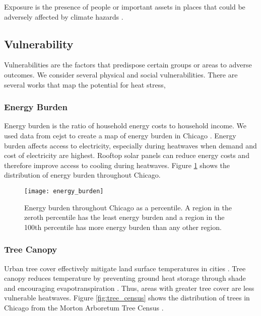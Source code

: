 Exposure is the presence of people or important assets in places that could be
adversely affected by climate hazards \cite{viner_understanding_2020}.

\subsection{Vulnerability}

Vulnerabilities are the factors that predispose certain groups or areas to adverse
outcomes. We consider several physical and social vulnerabilities. There are several
works that map the potential for heat stress, 

\subsubsection{Energy Burden}

Energy burden is the ratio of household energy costs to household income. We
used data from \ac{cejst} to create a map of energy burden in Chicago
\cite{council_on_environmental_quality_climate_nodate}. Energy
burden affects access to electricity, especially during heatwaves when demand
and cost of electricity are highest. Rooftop solar panels can reduce energy costs
and therefore improve access to cooling during heatwaves. Figure \ref{fig:eb} shows
the distribution of energy burden throughout Chicago.

\begin{figure}[H]
  \label{fig:eb}
    \begin{center}
      \texttt{[image: energy\_burden]}
      \vspace*{-2cm}
      \caption{Energy burden throughout Chicago as a percentile. A region in the zeroth
      percentile has the least energy burden and a region in the 100th percentile has
      more energy burden than any other region.}
    \end{center}
\end{figure}

\subsubsection{Tree Canopy}

Urban tree cover effectively mitigate land surface temperatures in cities
\cite{loughner_roles_2012, schwaab_role_2021, mcdonald_tree_2021}. Tree canopy
reduces temperature by preventing ground heat storage through shade and encouraging
evapotranspiration \cite{mcdonald_tree_2021}. Thus, areas with greater tree cover
are less vulnerable heatwaves. Figure \ref{fig:tree_census} shows the distribution
of trees in Chicago from the Morton Arboretum Tree Census \cite{kua_chicago_2020}.

